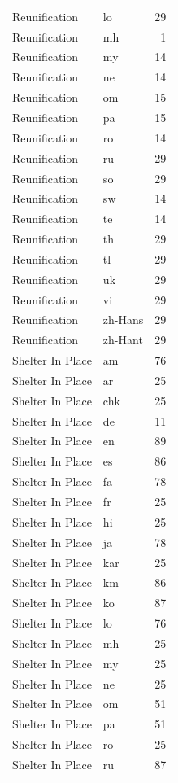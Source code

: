 \begin{longtable}{p{3cm} p{3cm} r}
Reunification & lo & 29 \\
Reunification & mh & 1 \\
Reunification & my & 14 \\
Reunification & ne & 14 \\
Reunification & om & 15 \\
Reunification & pa & 15 \\
Reunification & ro & 14 \\
Reunification & ru & 29 \\
Reunification & so & 29 \\
Reunification & sw & 14 \\
Reunification & te & 14 \\
Reunification & th & 29 \\
Reunification & tl & 29 \\
Reunification & uk & 29 \\
Reunification & vi & 29 \\
Reunification & zh-Hans & 29 \\
Reunification & zh-Hant & 29 \\
Shelter In Place & am & 76 \\
Shelter In Place & ar & 25 \\
Shelter In Place & chk & 25 \\
Shelter In Place & de & 11 \\
Shelter In Place & en & 89 \\
Shelter In Place & es & 86 \\
Shelter In Place & fa & 78 \\
Shelter In Place & fr & 25 \\
Shelter In Place & hi & 25 \\
Shelter In Place & ja & 78 \\
Shelter In Place & kar & 25 \\
Shelter In Place & km & 86 \\
Shelter In Place & ko & 87 \\
Shelter In Place & lo & 76 \\
Shelter In Place & mh & 25 \\
Shelter In Place & my & 25 \\
Shelter In Place & ne & 25 \\
Shelter In Place & om & 51 \\
Shelter In Place & pa & 51 \\
Shelter In Place & ro & 25 \\
Shelter In Place & ru & 87 \\

\end{longtable}
